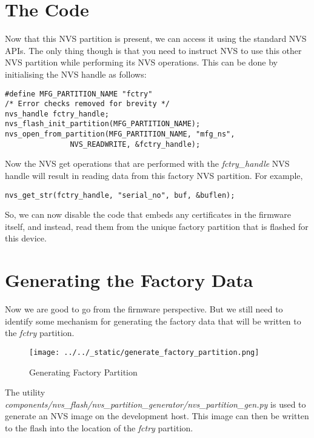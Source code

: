 \documentclass[main.tex]{subfiles}
\begin{document}
\section{The Code}
Now that this NVS partition is present, we can access it using the standard NVS APIs. The only thing though is that you need to instruct NVS to use this other NVS partition while performing its NVS operations. This can be done by initialising the NVS handle as follows:

\begin{verbatim}
#define MFG_PARTITION_NAME "fctry"
/* Error checks removed for brevity */
nvs_handle fctry_handle;
nvs_flash_init_partition(MFG_PARTITION_NAME);
nvs_open_from_partition(MFG_PARTITION_NAME, "mfg_ns",
               NVS_READWRITE, &fctry_handle);
\end{verbatim}

Now the NVS get operations that are performed with the \textit{fctry\_handle} NVS handle will result in reading data from this factory NVS partition. For example,

\begin{verbatim}
nvs_get_str(fctry_handle, "serial_no", buf, &buflen);
\end{verbatim}

So, we can now disable the code that embeds any certificates in the firmware itself, and instead, read them from the unique factory partition that is flashed for this device.

\section{Generating the Factory Data}\label{sec:gen_factory_data}
Now we are good to go from the firmware perspective. But we still need to identify some mechanism for generating the factory data that will be written to the \textit{fctry} partition.

\begin{figure}
    \centering
    \texttt{[image: ../../\_static/generate\_factory\_partition.png]}
    \caption{Generating Factory Partition}
    \label{fig:gen_fac_part}
\end{figure}

The utility \textit{components/nvs\_flash/nvs\_partition\_generator/nvs\_partition\_gen.py} is used to generate an NVS image on the development host. This image can then be written to the flash into the location of the \textit{fctry} partition.
\end{document}
